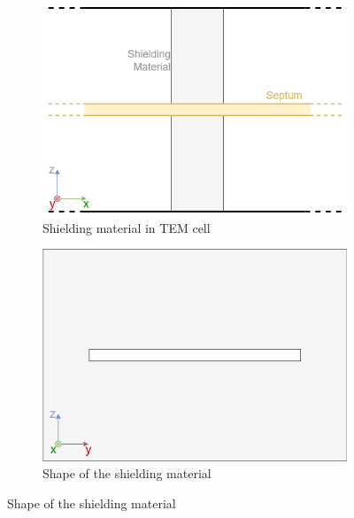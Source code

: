 \begin{figure}[h]
    \centering
    \begin{subfigure}[h]{0.49\textwidth}
        \centering
        \includegraphics[width=\textwidth]{Documentation//content//10_theory//img/ASTM ES7-83.png}
        \caption{Shielding material in TEM cell}
        \label{fig:ASTM ES7-83}
    \end{subfigure}%
    \hfill
    \begin{subfigure}[h]{0.49\textwidth}
        \centering
        \includegraphics[width=\textwidth]{Documentation//content//10_theory/img/form_of_shielding_material.png}
        \caption{Shape of the shielding material}
        \label{fig:form_of_shielding_material}
    \end{subfigure}
    \label{fig:subfigures}
\end{figure}

